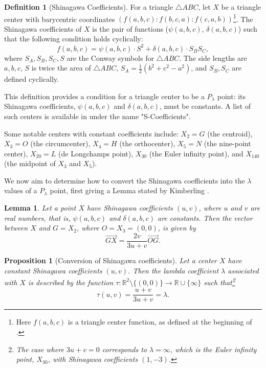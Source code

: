 \documentclass{birkjour}
\newtheorem{lem}[thm]{Lemma}
\newtheorem{prop}[thm]{Proposition}
\theoremstyle{definition}
\newtheorem{defn}[thm]{Definition}
\theoremstyle{remark}
\numberwithin{equation}{section}
\begin{document}
\begin{defn}[Shinagawa Coefficients]
    For a triangle \(\triangle ABC\), let \(X\) be a triangle center with barycentric coordinates \( (f(a,b,c):f(b,c,a):f(c,a,b))\)\footnote{Here $f(a,b,c)$ is a triangle center function, as defined at the beginning of \cite{Kimberling}.}. The Shinagawa coefficients of \(X\) is the pair of functions (\(\psi(a,b,c)\), \(\delta(a,b,c)\)) such that the following condition holds cyclically:
    \begin{equation} 
    f(a,b,c) = \psi(a,b,c) \cdot S^2 + \delta(a,b,c) \cdot S_BS_C,
    \end{equation}
    where \(S_A, S_B, S_C, S\) are the Conway symbols for \(\triangle ABC\). The side lengths are \(a,b,c\), \(S\) is twice the area of \(\triangle ABC\), \(S_A = \frac{1}{2} (b^2+c^2-a^2)\), and \(S_B, S_C\) are defined cyclically.    
\end{defn}

This definition provides a condition for a triangle center to be a $P_{\lambda}$ point: its Shinagawa coefficients, \(\psi(a,b,c)\) and \(\delta(a,b,c)\), must be constants. A list of such centers is available in \cite{TablesKimberling} under the name "S-Coefficients". 

Some notable centers with constant coefficients include: $X_2 = G$ (the centroid), $X_{3} = O$ (the circumcenter), $X_4 = H$ (the orthocenter), $X_5 = N$ (the nine-point center), \(X_{20} = L\) (de Longchamps point), $X_{30}$ (the Euler infinity point), and \(X_{140}\) (the midpoint of \(X_3\) and \(X_5\)).

We now aim to determine how to convert the Shinagawa coefficients into the \(\lambda\) values of a $P_{\lambda}$ point, first giving a Lemma stated by Kimberling \cite{Kimberling}. 

\begin{lem}\label{shinagawa}
    Let a point \(X\) have Shinagawa coefficients \((u, v)\), where \(u\) and \(v\) are real numbers, that is, \(\psi(a,b,c)\) and \(\delta(a,b,c)\) are constants. Then the vector between \(X\) and \(G=X_2\), where $O=X_3=(0,0)$, is given by
    \begin{equation}
        \overrightarrow{GX} = \frac{2v}{3u + v}\overrightarrow{OG}.
    \end{equation}
\end{lem}

\begin{prop}[Conversion of Shinagawa coefficients]
    Let a center \(X\) have constant Shinagawa coefficients \((u, v)\). Then the lambda coefficient $\lambda$ associated with \(X\) is described by the function \(\tau: \mathbb{R}^2 \setminus \{ (0,0)\} \rightarrow \mathbb{R} \cup \{ \infty\}\) such that\footnote{The case where $3u+v=0$ corresponds to $\lambda = \infty$, which is the Euler infinity point, $X_{30}$, with Shinagawa coefficients $(1, -3)$.} 
    \begin{equation}\label{shinagawafor}
        \tau(u, v) = \frac{u + v}{3u + v} = \lambda.
    \end{equation}
\end{prop}
\end{document}
